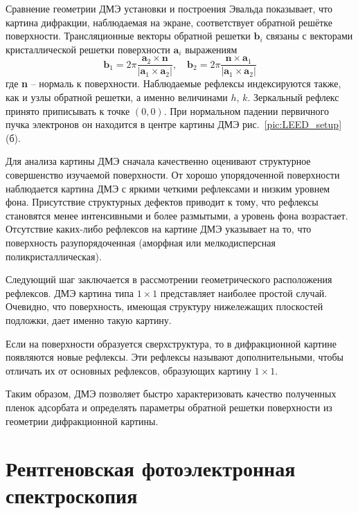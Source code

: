 Сравнение геометрии ДМЭ установки и построения Эвальда показывает, 
что картина дифракции, наблюдаемая на экране, соответствует обратной 
решётке поверхности. Трансляционные векторы обратной решетки 
$\textbf{b}_i$ связаны с векторами кристаллической решетки поверхности
$\textbf{a}_i$ выражениям
	\begin{equation}
		\textbf{b}_1=2\pi\frac{\textbf{a}_2\times\textbf{n}}{|\textbf{a}_1\times\textbf{a}_2|},\quad\textbf{b}_2=2\pi\frac{\textbf{n}\times\textbf{a}_1}{|\textbf{a}_1\times\textbf{a}_2|}
	\end{equation}
где \textbf{n} -- нормаль к поверхности.
Наблюдаемые рефлексы индексируются также, как и 
узлы обратной решетки, а именно величинами $h$, $k$. Зеркальный рефлекс
принято приписывать к точке $(0,0)$. При нормальном падении первичного
пучка электронов он находится в центре картины ДМЭ рис.~\ref{pic:LEED_setup}(б).


Для анализа картины ДМЭ сначала качественно оценивают структурное
совершенство изучаемой поверхности. От хорошо упорядоченной поверхности
наблюдается картина ДМЭ с яркими четкими рефлексами и низким уровнем
фона. Присутствие структурных дефектов приводит к тому, что рефлексы
становятся менее интенсивными и более размытыми, а уровень фона 
возрастает. Отсутствие каких-либо рефлексов на картине ДМЭ указывает
на то, что поверхность разупорядоченная (аморфная или мелкодисперсная
поликристаллическая).


Следующий шаг заключается в рассмотрении геометрического расположения
рефлексов. ДМЭ картина типа $1\times1$ представляет наиболее простой
случай. Очевидно, что поверхность, имеющая структуру нижележащих 
плоскостей подложки, дает именно такую картину.


Если на поверхности образуется сверхструктура, то в дифракционной 
картине появляются новые рефлексы. Эти рефлексы называют 
дополнительными, чтобы отличать их от основных рефлексов, образующих
картину $1\times1$.


Таким образом, ДМЭ позволяет быстро характеризовать качество полученных
пленок адсорбата и определять параметры обратной решетки поверхности 
из геометрии дифракционной картины.






\section{Рентгеновская фотоэлектронная спектроскопия} \label{method_XPS}


